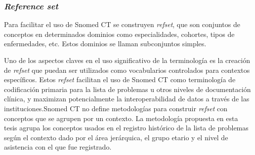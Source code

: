 \begin{table}[htb]
\centering
\caption{Jerarquías de la lista de problemas y frecuencias de uso}
\label{jerarquiasLista}
\end{table}

\subsubsection{\textit{Reference set}}
\label{par:refset}
Para facilitar el uso de Snomed CT se construyen \textit{\acrfull{refset}}, que son conjuntos de conceptos en determinados dominios como especialidades, cohortes, tipos de enfermedades, etc. Estos dominios se llaman subconjuntos simples.

Uno de los aspectos claves en el uso significativo de la terminología es la creación de \textit{\acrshort{refset}} que puedan ser utilizados como vocabularios controlados para contextos específicos. Estos \textit{\acrshort{refset}} facilitan el uso de Snomed CT como terminología de codificación primaria para la lista de problemas u otros niveles de documentación clínica, y maximizan potencialmente la interoperabilidad de datos a través de las instituciones\cite{Dolin2004KaiserTerminology.}.Snomed CT no define metodologías para construir \textit{\acrshort{refset}} con conceptos que se agrupen por un contexto. La metodología propuesta en esta tesis agrupa los conceptos usados en el registro histórico de la lista de problemas según el contexto dado por el área jerárquica, el grupo etario y el nivel de asistencia con el que fue registrado. 

